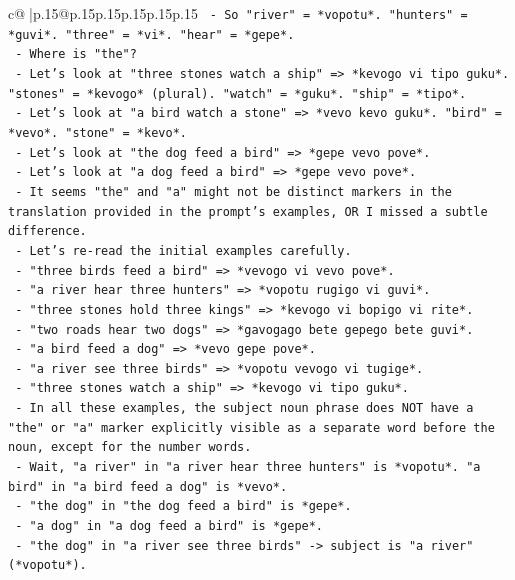 \documentclass{article}
\begin{document}
{\begin{supertabular}{c@{$\;$}|p{.15\linewidth}@{}p{.15\linewidth}p{.15\linewidth}p{.15\linewidth}p{.15\linewidth}p{.15\linewidth}}
{{{\texttt{  {-} So "river" = *vopotu*. "hunters" = *guvi*. "three" = *vi*. "hear" = *gepe*.} \\
\texttt{  {-} Where is "the"?} \\
\texttt{  {-} Let's look at "three stones watch a ship" => *kevogo vi tipo guku*. "stones" = *kevogo* (plural). "watch" = *guku*. "ship" = *tipo*.} \\
\texttt{  {-} Let's look at "a bird watch a stone" => *vevo kevo guku*. "bird" = *vevo*. "stone" = *kevo*.} \\
\texttt{  {-} Let's look at "the dog feed a bird" => *gepe vevo pove*.} \\
\texttt{  {-} Let's look at "a dog feed a bird" => *gepe vevo pove*.} \\
\texttt{  {-} It seems "the" and "a" might not be distinct markers in the translation provided in the prompt's examples, OR I missed a subtle difference.} \\
\texttt{  {-} Let's re{-}read the initial examples carefully.} \\
\texttt{  {-} "three birds feed a bird" => *vevogo vi vevo pove*.} \\
\texttt{  {-} "a river hear three hunters" => *vopotu rugigo vi guvi*.} \\
\texttt{  {-} "three stones hold three kings" => *kevogo vi bopigo vi rite*.} \\
\texttt{  {-} "two roads hear two dogs" => *gavogago bete gepego bete guvi*.} \\
\texttt{  {-} "a bird feed a dog" => *vevo gepe pove*.} \\
\texttt{  {-} "a river see three birds" => *vopotu vevogo vi tugige*.} \\
\texttt{  {-} "three stones watch a ship" => *kevogo vi tipo guku*.} \\
\texttt{  {-} In all these examples, the subject noun phrase does NOT have a "the" or "a" marker explicitly visible as a separate word before the noun, except for the number words.} \\
\texttt{  {-} Wait, "a river" in "a river hear three hunters" is *vopotu*. "a bird" in "a bird feed a dog" is *vevo*.} \\
\texttt{  {-} "the dog" in "the dog feed a bird" is *gepe*.} \\
\texttt{  {-} "a dog" in "a dog feed a bird" is *gepe*.} \\
\texttt{  {-} "the dog" in "a river see three birds" {-}> subject is "a river" (*vopotu*).} \\
}}}
\end{supertabular}}
\end{document}
